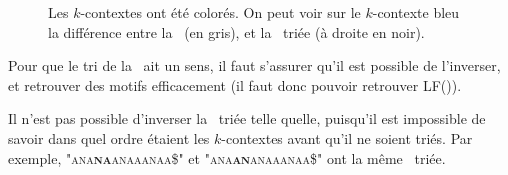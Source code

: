 \begin{figure}[h!]
\caption{Les $k$-contextes ont été colorés. On peut voir sur le $k$-contexte bleu la différence entre la \kbwt\ (en gris), et la \kbwt\ triée (à droite en noir).}
\label{tri}
\end{figure}



Pour que le tri de la \kbwt\ ait un sens, il faut s'assurer qu'il est possible de l'inverser, et retrouver des motifs efficacement (il faut donc pouvoir retrouver LF()).

Il n'est pas possible d'inverser la \kbwt\ triée telle quelle, puisqu'il est impossible de savoir dans quel ordre étaient les $k$-contextes avant qu'il ne soient triés. Par exemple, \textsc{"ana\textbf{na}anaaanaa\$"} et \textsc{"ana\textbf{an}anaaanaa\$"} ont la même \kbwt\ triée.


